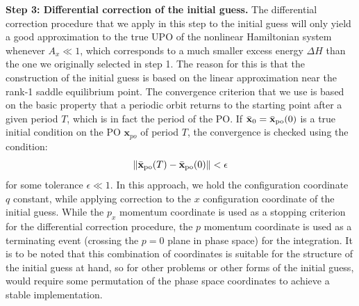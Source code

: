 \documentclass{ws-ijbc}
\begin{document}
\textbf{Step 3: Differential correction of the initial guess.} The differential correction procedure that we apply in this step to the initial guess will only yield a good approximation to the true UPO of the nonlinear Hamiltonian system whenever  $A_x \ll 1$, which corresponds to a much smaller excess energy $\Delta H$ than the one we originally selected in step 1. The reason for this is that the construction of the initial guess is based on the linear approximation near the rank-1 saddle equilibrium point. The convergence criterion that we use is based on the basic property that a periodic orbit returns to the starting point after a given period $T$, which is in fact the period of the PO. If $\bar{\mathbf{x}}_0 = \bar{\mathbf{x}}_{\rm po}(0)$ is a true initial condition on the PO $\mathbf{x}_{po}$ of period $T$, the convergence is checked using the condition:
\begin{equation}
\left\| \bar{\mathbf{x}}_{\rm po}(T) - 
\bar{\mathbf{x}}_{\rm po}(0) \right\| < \epsilon
\end{equation}
for some tolerance $\epsilon \ll 1$. In this approach, we hold the configuration coordinate $q$ constant, while applying correction to the $x$ configuration coordinate of the initial guess. While the $p_x$ momentum coordinate is used as a stopping criterion for the differential correction procedure, the $p$ momentum coordinate is used as a terminating event (crossing the $p = 0$ plane in phase space) for the integration. It is to be noted that this combination of coordinates is suitable for the structure of the initial guess at hand, so for other problems or other forms of the initial guess, would require some permutation of the phase space coordinates to achieve a stable implementation. 
\end{document}

